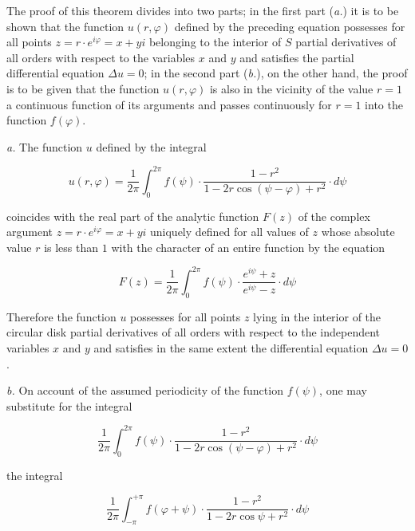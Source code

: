 \documentclass{article}
\begin{document}
The proof of this theorem divides into two parts; in the first part (\emph{a.}) it is to be shown that the function $u(r, \varphi)$ defined by the preceding equation possesses for all points $z = r \cdot e^{i\varphi} = x + yi$ belonging to the interior of $S$ partial derivatives of all orders with respect to the variables $x$ and $y$ and satisfies the partial differential equation $\Delta u = 0$; in the second part (\emph{b.}), on the other hand, the proof is to be given that the function $u(r, \varphi)$ is also in the vicinity of the value $r = 1$ a continuous function of its arguments and passes continuously for $r = 1$ into the function $f(\varphi)$.



\emph{a.} The function $u$ defined by the integral

\[

u(r, \varphi) = \frac{1}{2\pi} \int_0^{2\pi} f(\psi) \cdot \frac{1 - r^2}{1 - 2r \cos(\psi - \varphi) + r^2} \cdot d\psi

\]

coincides with the real part of the analytic function $F(z)$ of the complex argument $z = r \cdot e^{i\varphi} = x + yi$ uniquely defined for all values of $z$ whose absolute value $r$ is less than $1$ with the character of an entire function by the equation




\[

F(z) = \frac{1}{2\pi} \int_0^{2\pi} f(\psi) \cdot \frac{e^{i\psi} + z}{e^{i\psi} - z} \cdot d\psi

\]



Therefore the function $u$ possesses for all points $z$ lying in the interior of the circular disk partial derivatives of all orders with respect to the independent variables $x$ and $y$ and satisfies in the same extent the differential equation $\Delta u = 0$.



\emph{b.} On account of the assumed periodicity of the function $f(\psi)$, one may substitute for the integral

\[

\frac{1}{2\pi} \int_0^{2\pi} f(\psi) \cdot \frac{1 - r^2}{1 - 2r \cos(\psi - \varphi) + r^2} \cdot d\psi

\]

the integral

\[

\frac{1}{2\pi} \int_{-\pi}^{+\pi} f(\varphi + \psi) \cdot \frac{1 - r^2}{1 - 2r \cos\psi + r^2} \cdot d\psi

\]
\end{document}
